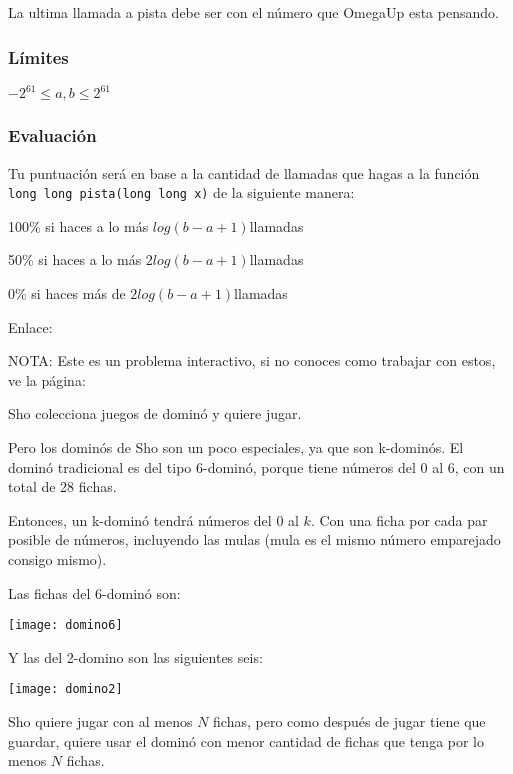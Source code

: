 La ultima llamada a pista debe ser con el número que OmegaUp esta pensando.

\subsubsection*{Límites}
\begin{plimits}
	\item \(-2^{61}\leq a,b \leq 2^{61}\)	
\end{plimits}
\subsubsection*{Evaluación}
Tu puntuación será en base a la cantidad de llamadas que hagas a la función \verb|long long pista(long long x)| de la siguiente manera:
\begin{plimits}
	\item 100\% si haces a lo más \(log(b-a+1)\)llamadas
	\item 50\% si haces a lo más \(2log(b-a+1)\)llamadas
	\item 0\% si haces más de \(2log(b-a+1)\)llamadas
\end{plimits}

Enlace: 

NOTA: Este es un problema interactivo, si no conoces como trabajar con estos, ve la página: \pageref{interactivos}

\problembreak

\problemtitle Sho colecciona juegos de dominó y quiere jugar.

Pero los dominós de Sho son un poco especiales, ya que son k-dominós. El dominó tradicional es del tipo 6-dominó, porque tiene números del \(0\) al \(6\), con un total de 28 fichas.

Entonces, un k-dominó tendrá números del \(0\) al \(k\). Con una ficha por cada par posible de números, incluyendo las mulas (mula es el mismo número emparejado consigo mismo).

Las fichas del 6-dominó son:

\begin{center}
		\texttt{[image: domino6]}
\end{center}

Y las del 2-domino son las siguientes seis:
\begin{center}
	\texttt{[image: domino2]}
\end{center}

Sho quiere jugar con al menos \(N\) fichas, pero como después de jugar tiene que guardar, quiere usar el dominó con menor cantidad de fichas que tenga por lo menos \(N\) fichas. 

